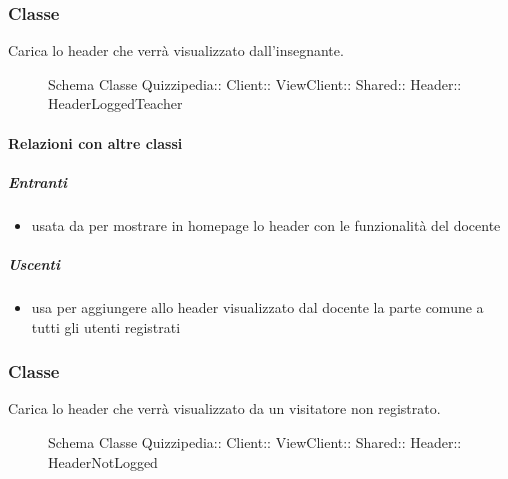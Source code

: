 \subsubsection{Classe }
Carica lo header che verrà visualizzato dall'insegnante.
\begin{figure}[H]
\centering
\noindent{}
\caption[Schema Classe HeaderLoggedTeacher]{Schema Classe Quizzipedia:: Client:: ViewClient:: Shared:: Header:: HeaderLoggedTeacher}
\end{figure}
\paragraph{Relazioni con altre classi}
\subparagraph{Entranti}
\begin{itemize}
\item usata da  per mostrare in homepage lo header con le funzionalità del docente
\end{itemize}
\subparagraph{Uscenti}
\begin{itemize}
\item usa  per aggiungere allo header visualizzato dal docente la parte comune a tutti gli utenti registrati
\end{itemize}
\subsubsection{Classe }
Carica lo header che verrà visualizzato da un visitatore non registrato.
\begin{figure}[H]
\centering
\noindent{}
\caption[Schema Classe HeaderNotLogged]{Schema Classe Quizzipedia:: Client:: ViewClient:: Shared:: Header:: HeaderNotLogged}
\end{figure}
